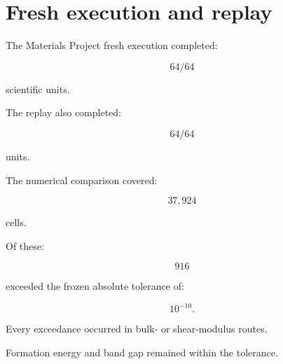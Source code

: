 \documentclass[11pt,a4paper,oneside]{report}
\begin{document}
\section{Fresh execution and replay}



The Materials Project fresh execution completed:



\begin{equation}
64/64
\end{equation}



scientific units.



The replay also completed:



\begin{equation}
64/64
\end{equation}



units.



The numerical comparison covered:



\begin{equation}
37{,}924
\end{equation}



cells.



Of these:



\begin{equation}
916
\end{equation}



exceeded the frozen absolute tolerance of:



\begin{equation}
10^{-10}.
\end{equation}



Every exceedance occurred in bulk- or shear-modulus routes.



Formation energy and band gap remained within the tolerance.
\end{document}
